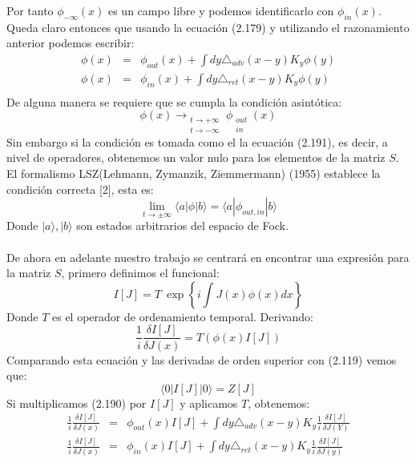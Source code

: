 Por tanto $\phi_{-\infty}(x)$ es un campo libre y podemos identificarlo con $\phi_{in}(x)$. Queda claro entonces que usando la ecuación (2.179) y utilizando el razonamiento anterior podemos escribir:
\begin{eqnarray}
\nonumber \phi(x)&=&\phi_{out}(x)+\int dy\triangle_{adv}(x-y)K_{y}\phi(y)\\
\nonumber \phi(x)&=&\phi_{in}(x)+\int dy\triangle_{ret}(x-y)K_{y}\phi(y)\\
\end{eqnarray}
De alguna manera se requiere que se cumpla la condición asintótica:
\begin{equation}
 \phi(x)\longrightarrow_{\begin{array}{c}
t\to+\infty\\
t\to-\infty
\end{array}}\phi_{\begin{array}{c}
out\\
in
\end{array}}(x)	
\end{equation} 
Sin embargo si la condición es tomada como el la ecuación (2.191), es decir, a nivel de operadores, obtenemos un valor nulo para los elementos de la matriz $S$. El formalismo LSZ(Lehmann, Zymanzik, Ziemmermann) (1955) establece la condición correcta [2], esta es:
\begin{equation}
\lim_{t\to\pm\infty}\langle a|\phi|b\rangle=\langle a|\phi_{out,in}|b\rangle
\end{equation}
Donde $|a\rangle,|b\rangle$ son estados arbitrarios del espacio de Fock.
\\
\\
De ahora en adelante nuestro trabajo se centrará en encontrar una expresión para la matriz $S$, primero definimos el funcional:
\begin{equation}
I[J]=T\ \exp\left\{ i\int J(x)\phi(x)dx\right\} 
\end{equation}
Donde $T$ es el operador de ordenamiento temporal. Derivando:
\begin{equation}
\frac{1}{i}\frac{\delta I[J]}{\delta J(x)}=T(\phi(x)I[J])
\end{equation} 
Comparando esta ecuación y las derivadas de orden superior con (2.119) vemos que:
\begin{equation}
\langle 0|I[J]|0\rangle=Z[J]
\end{equation}
Si multiplicamos (2.190) por $I[J]$ y aplicamos $T$, obtenemos:
\begin{eqnarray}
\nonumber \frac{1}{i}\frac{\delta I[J]}{\delta J(x)}&=&\phi_{out}(x)I[J]+\int dy\triangle_{adv}(x-y)K_{y}\frac{1}{i}\frac{\delta I[J]}{\delta J(Y)}\\
\nonumber \frac{1}{i}\frac{\delta I[J]}{\delta J(x)}&=&\phi_{in}(x)I[J]+\int dy\triangle_{ret}(x-y)K_{y}\frac{1}{i}\frac{\delta I[J]}{\delta J(y)}\\
\end{eqnarray}
